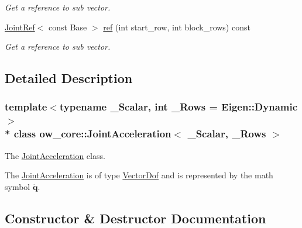 \begin{DoxyCompactItemize}
\begin{DoxyCompactList}\small\item\em Get a reference to sub vector. \end{DoxyCompactList}\item 
\hyperlink{classow__core_1_1JointRef}{Joint\+Ref}$<$ const Base $>$ \hyperlink{classow__core_1_1JointAcceleration_ae701f2a538d78ba29b2e136ed99e91c4}{ref} (int start\+\_\+row, int block\+\_\+rows) const \hypertarget{classow__core_1_1JointAcceleration_ae701f2a538d78ba29b2e136ed99e91c4}{}\label{classow__core_1_1JointAcceleration_ae701f2a538d78ba29b2e136ed99e91c4}

\begin{DoxyCompactList}\small\item\em Get a reference to sub vector. \end{DoxyCompactList}\end{DoxyCompactItemize}


\subsection{Detailed Description}
\subsubsection*{template$<$typename \+\_\+\+Scalar, int \+\_\+\+Rows = Eigen\+::\+Dynamic$>$\\*
class ow\+\_\+core\+::\+Joint\+Acceleration$<$ \+\_\+\+Scalar, \+\_\+\+Rows $>$}

The \hyperlink{classow__core_1_1JointAcceleration}{Joint\+Acceleration} class. 

The \hyperlink{classow__core_1_1JointAcceleration}{Joint\+Acceleration} is of type \hyperlink{classow__core_1_1VectorDof}{Vector\+Dof} and is represented by the math symbol $\mathbf{\ddot{q}}$. 

\subsection{Constructor \& Destructor Documentation}
